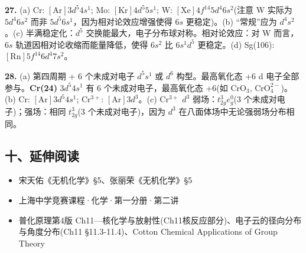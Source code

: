 \textbf{27.} (a) Cr: \([\mathrm{Ar}]3d^5 4s^1\); Mo: \([\mathrm{Kr}]4d^5 5s^1\); W: \([\mathrm{Xe}]4f^{14} 5d^4 6s^2\)(注意 W 实际为 \(5d^4 6s^2\) 而非 \(5d^5 6s^1\)，因为相对论效应增强使得 \(6s\) 更稳定)。(b) ``常规''应为 \(d^4 s^2\)。(c) 半满稳定化：\(d^5\) 交换能最大，电子分布球对称。相对论效应：对 W 而言，\(6s\) 轨道因相对论收缩而能量降低，使得 \(6s^2\) 比 \(6s^1 d^5\) 更稳定。(d) Sg(106): \([\mathrm{Rn}]5f^{14} 6d^4 7s^2\)。

\textbf{28.} (a) 第四周期 + 6 个未成对电子 \箭 \(d^5 s^1\) 或 \(d^6\) 构型。最高氧化态 +6 \箭 d 电子全部参与。\textbf{Cr(24)} \(3d^5 4s^1\) 有 6 个未成对电子，最高氧化态 +6(如 \(\mathrm{CrO_3}\), \(\mathrm{CrO_4^{2-}}\))。(b) Cr: \([\mathrm{Ar}]3d^5 4s^1\); \(\mathrm{Cr^{3+}}\): \([\mathrm{Ar}]3d^3\)。(c) \(\mathrm{Cr^{3+}}\) \(d^3\) 弱场：\(t_{2g}^3 e_g^0\)(3 个未成对电子)；强场：相同 \(t_{2g}^3\)(3 个未成对电子)，因为 \(d^3\) 在八面体场中无论强弱场分布相同。

\subsection{十、延伸阅读}\label{ux5341ux5ef6ux4f38ux9605ux8bfb}

\begin{itemize}
\tightlist
\item
  宋天佑《无机化学》§5、张丽荣《无机化学》§5
\item
  上海中学竞赛课程·化学·第一分册·第二讲
\item
  普化原理第4版 Ch11---核化学与放射性(Ch11核反应部分)、电子云的径向分布与角度分布(Ch11 §11.3-11.4)、Cotton Chemical Applications of Group Theory
\end{itemize}
